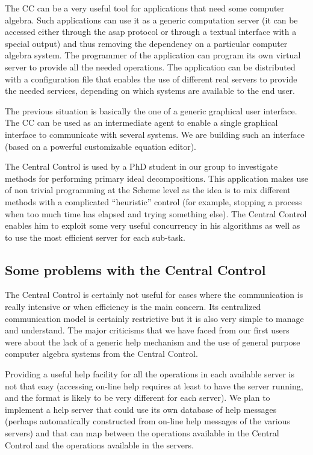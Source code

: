 \documentclass {article}
\begin{document}
The CC can be a very useful tool for applications that need some computer
algebra. Such applications can use it as a generic computation server (it can
be accessed either through the {\sc asap} protocol or through a textual
interface with a special output) and thus removing the dependency on a
particular computer algebra system. 
The programmer of the application can program its own virtual
server to provide all the needed operations.
The application can be distributed with a configuration file that
enables the use of different real servers to provide the needed services,
depending on which systems are available to the end user.

The previous situation is basically the one of a generic graphical user
interface. 
The CC can be used as an intermediate agent to enable a single graphical
interface to communicate with several systems. We are building such an
interface (based on a powerful customizable equation editor).

The Central Control is used by a PhD student in our group to investigate
methods for performing primary ideal decompositions. This application makes
use of non trivial programming at the Scheme level as the idea is to mix
different methods with a complicated ``heuristic'' control (for example,
stopping a process when too much time has elapsed and trying something else). 
The Central Control enables him to exploit some very useful concurrency in
his algorithms as well as to use the most efficient server for each sub-task.

\subsection*{Some problems with the Central Control}

The Central Control is certainly not useful for cases where the communication
is really intensive or when efficiency is the main concern. Its centralized
communication model is certainly restrictive but it is also very simple to
manage and understand.
The major criticisms that we have faced from our first users were about
the lack of a generic help mechanism and the use of general purpose computer
algebra systems from the Central Control. 

Providing a useful help facility for all the operations in each
available server is not that easy (accessing on-line help requires at
least to have the server running, and the format is likely to be very
different for each server). We plan to implement a help server that could use
its own database of help messages (perhaps automatically constructed from
on-line help messages of the various servers)  and 
that can map between the operations available in the Central Control and
the operations available in the servers.
\end{document}
